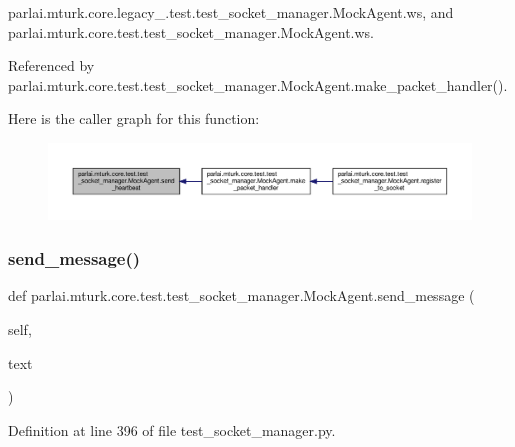 parlai.\+mturk.\+core.\+legacy\+\_.\+test.\+test\+\_\+socket\+\_\+manager.\+Mock\+Agent.\+ws, and parlai.\+mturk.\+core.\+test.\+test\+\_\+socket\+\_\+manager.\+Mock\+Agent.\+ws.



Referenced by parlai.\+mturk.\+core.\+test.\+test\+\_\+socket\+\_\+manager.\+Mock\+Agent.\+make\+\_\+packet\+\_\+handler().

Here is the caller graph for this function\+:
\nopagebreak
\begin{figure}[H]
\begin{center}
\leavevmode
\includegraphics[width=350pt]{classparlai_1_1mturk_1_1core_1_1test_1_1test__socket__manager_1_1MockAgent_ad0ffb0ccd7e4ea967910e322aa698537_icgraph}
\end{center}
\end{figure}
\mbox{\label{classparlai_1_1mturk_1_1core_1_1test_1_1test__socket__manager_1_1MockAgent_afc1922a7c72563531ab91a1244776f2d}} 
\subsubsection{\texorpdfstring{send\+\_\+message()}{send\_message()}}
{\footnotesize\ttfamily def parlai.\+mturk.\+core.\+test.\+test\+\_\+socket\+\_\+manager.\+Mock\+Agent.\+send\+\_\+message (\begin{DoxyParamCaption}\item[{}]{self,  }\item[{}]{text }\end{DoxyParamCaption})}



Definition at line 396 of file test\+\_\+socket\+\_\+manager.\+py.



